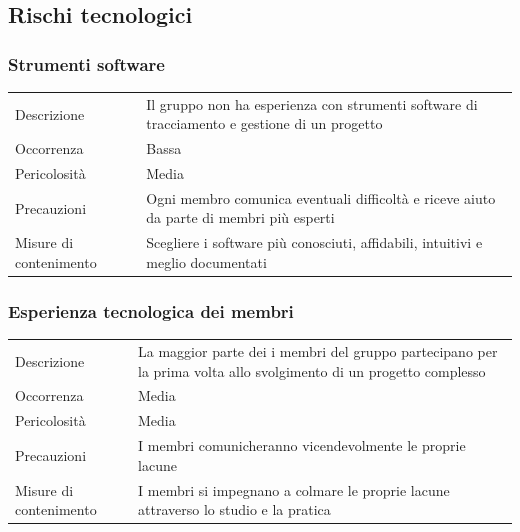 \documentclass{article}
\begin{document}
\subsection{Rischi tecnologici}
\subsubsection{Strumenti software}
\begin{center}
\begin{tabular}{P{10em} P{20em}} 
     Descrizione & Il gruppo non ha esperienza con strumenti software di tracciamento e gestione di un progetto\\ 
    Occorrenza & Bassa\\
    Pericolosità & Media \\
    Precauzioni & Ogni membro comunica eventuali difficoltà e riceve aiuto da parte di membri più esperti \\
    Misure di contenimento & Scegliere i software più conosciuti, affidabili, intuitivi e meglio documentati \\
\end{tabular}
\label{tab:sofrware}
\end{center}

\subsubsection{Esperienza tecnologica dei membri}
\begin{center}
\begin{tabular}{P{10em} P{20em}} 
     Descrizione & La maggior parte dei i membri del gruppo partecipano per la prima volta allo svolgimento di un progetto complesso \\ 
    Occorrenza & Media\\
    Pericolosità & Media \\
    Precauzioni & I membri comunicheranno vicendevolmente le proprie lacune\\
    Misure di contenimento & I membri si impegnano a colmare le proprie lacune attraverso lo studio e la pratica \\
\end{tabular}
\label{tab:esptec}
\end{center}
\end{document}
